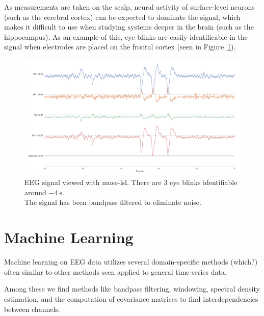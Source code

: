     As measurements are taken on the scalp, neural activity of surface-level neurons (such as the cerebral cortex) can be expected to dominate the signal, which makes it difficult to use when studying systems deeper in the brain (such as the hippocampus). As an example of this, eye blinks are easily identifieable in the signal when electrodes are placed on the frontal cortex (seen in Figure~\ref{fig:muselsl-signal}).



    \begin{figure}
        \begin{center}
            \includegraphics[trim=60 50 50 60,clip,width=24cm]{img/muselsl-signal.png}
        \end{center}
        \caption{EEG signal viewed with muse-lsl. There are 3 eye blinks identifiable around $\SI{-4}{\second}$.\\ The signal has been bandpass filtered to eliminate noise.}\label{fig:muselsl-signal}
    \end{figure}

\section{Machine Learning}

    Machine learning on EEG data utilizes several domain-specific methods (which?) often similar to other methods seen applied to general time-series data.

    Among these we find methods like bandpass filtering, windowing, spectral density estimation, and the computation of covariance matrices to find interdependencies between channels.


